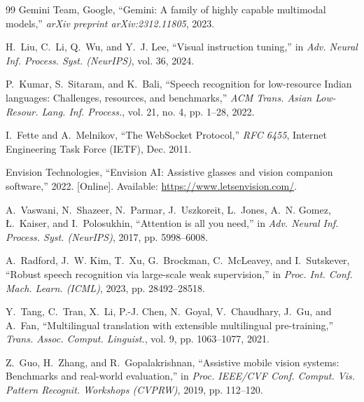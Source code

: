 \documentclass[10pt,a4paper]{article}
\begin{document}
\begin{thebibliography}{99}
Gemini Team, Google, ``Gemini: A family of highly capable multimodal models,'' \textit{arXiv preprint arXiv:2312.11805}, 2023.

H.~Liu, C.~Li, Q.~Wu, and Y.~J. Lee, ``Visual instruction tuning,'' in \textit{Adv. Neural Inf. Process. Syst. (NeurIPS)}, vol. 36, 2024.

P.~Kumar, S.~Sitaram, and K.~Bali, ``Speech recognition for low-resource Indian languages: Challenges, resources, and benchmarks,'' \textit{ACM Trans. Asian Low-Resour. Lang. Inf. Process.}, vol. 21, no. 4, pp. 1--28, 2022.

I.~Fette and A.~Melnikov, ``The WebSocket Protocol,'' \textit{RFC 6455}, Internet Engineering Task Force (IETF), Dec. 2011.

Envision Technologies, ``Envision AI: Assistive glasses and vision companion software,'' 2022. [Online]. Available: \url{https://www.letsenvision.com/}.

A.~Vaswani, N.~Shazeer, N.~Parmar, J.~Uszkoreit, L.~Jones, A.~N. Gomez, {\L}.~Kaiser, and I.~Polosukhin, ``Attention is all you need,'' in \textit{Adv. Neural Inf. Process. Syst. (NeurIPS)}, 2017, pp. 5998--6008.

A.~Radford, J.~W. Kim, T.~Xu, G.~Brockman, C.~McLeavey, and I.~Sutskever, ``Robust speech recognition via large-scale weak supervision,'' in \textit{Proc. Int. Conf. Mach. Learn. (ICML)}, 2023, pp. 28492--28518.

Y.~Tang, C.~Tran, X.~Li, P.-J. Chen, N.~Goyal, V.~Chaudhary, J.~Gu, and A.~Fan, ``Multilingual translation with extensible multilingual pre-training,'' \textit{Trans. Assoc. Comput. Linguist.}, vol. 9, pp. 1063--1077, 2021.

Z.~Guo, H.~Zhang, and R.~Gopalakrishnan, ``Assistive mobile vision systems: Benchmarks and real-world evaluation,'' in \textit{Proc. IEEE/CVF Conf. Comput. Vis. Pattern Recognit. Workshops (CVPRW)}, 2019, pp. 112--120.

\end{thebibliography}
\end{document}
